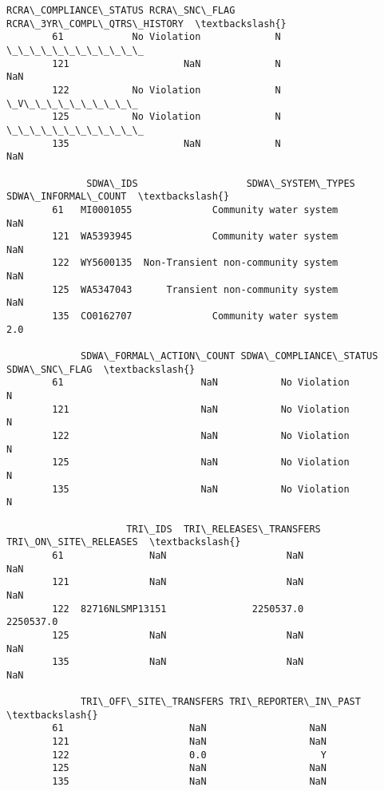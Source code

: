 \documentclass[11pt]{article}
\begin{document}
\begin{Verbatim}[commandchars=\\\{\}]
            RCRA\_COMPLIANCE\_STATUS RCRA\_SNC\_FLAG RCRA\_3YR\_COMPL\_QTRS\_HISTORY  \textbackslash{}
        61            No Violation             N                \_\_\_\_\_\_\_\_\_\_\_\_   
        121                    NaN             N                         NaN   
        122           No Violation             N                \_V\_\_\_\_\_\_\_\_\_\_   
        125           No Violation             N                \_\_\_\_\_\_\_\_\_\_\_\_   
        135                    NaN             N                         NaN   
        
              SDWA\_IDS                   SDWA\_SYSTEM\_TYPES  SDWA\_INFORMAL\_COUNT  \textbackslash{}
        61   MI0001055              Community water system                  NaN   
        121  WA5393945              Community water system                  NaN   
        122  WY5600135  Non-Transient non-community system                  NaN   
        125  WA5347043      Transient non-community system                  NaN   
        135  CO0162707              Community water system                  2.0   
        
             SDWA\_FORMAL\_ACTION\_COUNT SDWA\_COMPLIANCE\_STATUS SDWA\_SNC\_FLAG  \textbackslash{}
        61                        NaN           No Violation             N   
        121                       NaN           No Violation             N   
        122                       NaN           No Violation             N   
        125                       NaN           No Violation             N   
        135                       NaN           No Violation             N   
        
                     TRI\_IDS  TRI\_RELEASES\_TRANSFERS  TRI\_ON\_SITE\_RELEASES  \textbackslash{}
        61               NaN                     NaN                   NaN   
        121              NaN                     NaN                   NaN   
        122  82716NLSMP13151               2250537.0             2250537.0   
        125              NaN                     NaN                   NaN   
        135              NaN                     NaN                   NaN   
        
             TRI\_OFF\_SITE\_TRANSFERS TRI\_REPORTER\_IN\_PAST  \textbackslash{}
        61                      NaN                  NaN   
        121                     NaN                  NaN   
        122                     0.0                    Y   
        125                     NaN                  NaN   
        135                     NaN                  NaN   
        

\end{Verbatim}
\end{document}
